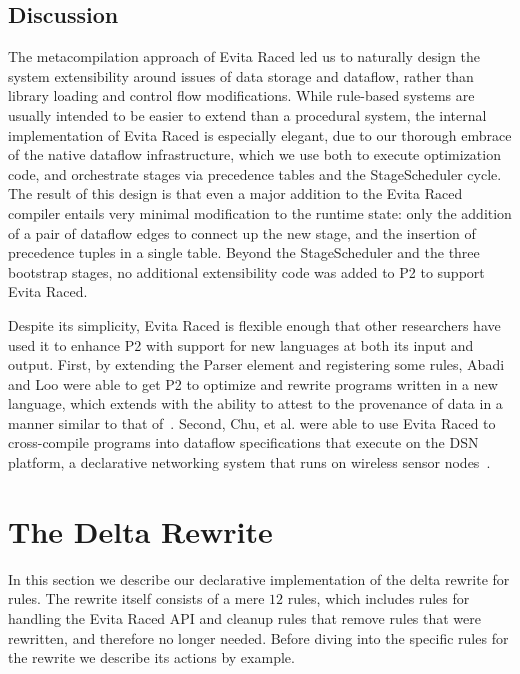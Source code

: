 % 


\subsection{Discussion}

The metacompilation approach of Evita Raced led us to naturally design the
system extensibility around issues of data storage and dataflow, rather than
library loading and control flow modifications.  While rule-based systems are
usually intended to be easier to extend than a procedural system, the internal
implementation of Evita Raced is especially elegant, due to our thorough
embrace of the native dataflow infrastructure, which we use both to execute
optimization code, and orchestrate stages via precedence tables and the
StageScheduler cycle.  The result of this design is that even a major addition
to the Evita Raced compiler entails very minimal modification to the runtime
state: only the addition of a pair of dataflow edges to connect up the new
stage, and the insertion of precedence tuples in a single table.  Beyond the
StageScheduler and the three bootstrap stages, no additional extensibility code
was added to P2 to support Evita Raced.

Despite its simplicity, Evita Raced is flexible enough that other researchers
have used it to enhance P2 with support for new languages at both its input and
output.  First, by extending the Parser element and registering some \OVERLOG
rules, Abadi and Loo were able to get P2 to optimize and rewrite programs
written in a new language, which extends \OVERLOG with the ability to attest to
the provenance of data in a manner similar to that of~\cite{abadi-netdb07}.
Second, Chu, et al. were able to use Evita Raced to cross-compile \OVERLOG programs
into dataflow specifications that execute on the DSN platform, a declarative
networking system that runs on wireless sensor nodes~\cite{chu-sensys07}.


\section{The Delta Rewrite}
\label{ch:evita:sec:delta}

In this section we describe our declarative implementation of the delta rewrite
for \OVERLOG rules.  The rewrite itself consists of a mere $12$ rules, which
includes rules for handling the Evita Raced API and cleanup rules that remove
rules that were rewritten, and therefore no longer needed. Before diving into
the specific rules for the rewrite we describe its actions by example.

